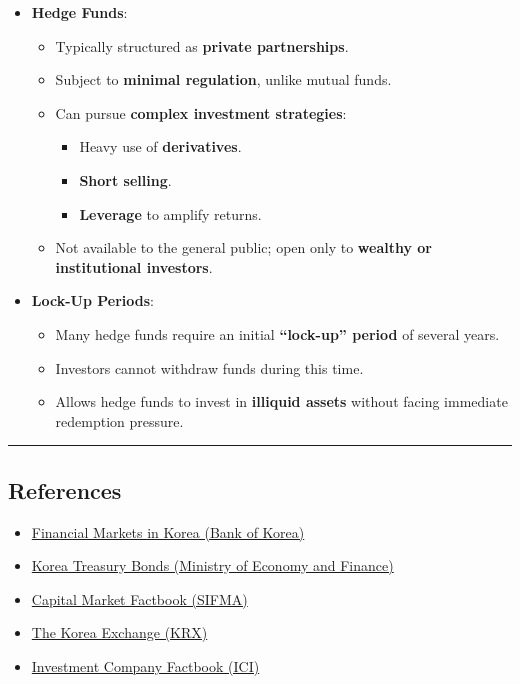 \documentclass[
  letterpaper,
  DIV=11,
  numbers=noendperiod]{scrartcl}
\providecommand{\tightlist}{%
  \setlength{\itemsep}{0pt}\setlength{\parskip}{0pt}}\usepackage{longtable,booktabs,array}
\begin{document}
\begin{itemize}
\tightlist
\item
  \textbf{Hedge Funds}:

  \begin{itemize}
  \tightlist
  \item
    Typically structured as \textbf{private partnerships}.
  \item
    Subject to \textbf{minimal regulation}, unlike mutual funds.
  \item
    Can pursue \textbf{complex investment strategies}:

    \begin{itemize}
    \tightlist
    \item
      Heavy use of \textbf{derivatives}.
    \item
      \textbf{Short selling}.
    \item
      \textbf{Leverage} to amplify returns.
    \end{itemize}
  \item
    Not available to the general public; open only to \textbf{wealthy or
    institutional investors}.
  \end{itemize}
\item
  \textbf{Lock-Up Periods}:

  \begin{itemize}
  \tightlist
  \item
    Many hedge funds require an initial \textbf{``lock-up'' period} of
    several years.
  \item
    Investors cannot withdraw funds during this time.
  \item
    Allows hedge funds to invest in \textbf{illiquid assets} without
    facing immediate redemption pressure.
  \end{itemize}
\end{itemize}

\begin{center}\rule{0.5\linewidth}{0.5pt}\end{center}

\subsection{References}\label{references}

\begin{itemize}
\tightlist
\item
  \href{https://www.bok.or.kr/portal/bbs/P0000603/list.do?menuNo=200460}{Financial
  Markets in Korea (Bank of Korea)}
\item
  \href{https://ktb.moef.go.kr/eng/main.do}{Korea Treasury Bonds
  (Ministry of Economy and Finance)}
\item
  \href{https://www.sifma.org/resources/research/fact-book/}{Capital
  Market Factbook (SIFMA)}
\item
  \href{http://global.krx.co.kr/}{The Korea Exchange (KRX)}
\item
  \href{https://www.icifactbook.org/}{Investment Company Factbook (ICI)}
\end{itemize}
\end{document}
